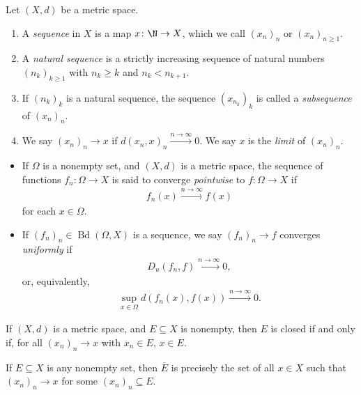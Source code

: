 \begin{definition}
  Let $\left(X,d\right)$ be a metric space.
  \begin{enumerate}[(1)]
    \item A \textit{sequence} in $X$ is a map $x\colon \N\rightarrow X$, which we call $\left(x_{n}\right)_{n}$ or $\left(x_{n}\right)_{n\geq 1}$.
    \item A \textit{natural sequence} is a strictly increasing sequence of natural numbers $\left(n_{k}\right)_{k\geq 1}$ with $n_{k}\geq k$ and $n_{k} < n_{k+1}$.
    \item If $\left(n_k\right)_{k}$ is a natural sequence, the sequence $\left(x_{n_k}\right)_{k}$ is called a \textit{subsequence} of $\left(x_{n}\right)_n$.
    \item We say $\left(x_n\right)_n\rightarrow x$ if $d\left(x_n,x\right)_{n} \xrightarrow{n\rightarrow\infty} 0$. We say $x$ is the \textit{limit} of $\left(x_n\right)_n$.
  \end{enumerate}
\end{definition}
\begin{example}\hfill
  \begin{itemize}
    \item If $\Omega$ is a nonempty set, and $\left(X,d\right)$ is a metric space, the sequence of functions $f_n\colon \Omega\rightarrow X$ is said to converge \textit{pointwise} to $f\colon \Omega\rightarrow X$ if
      \begin{align*}
        f_n\left(x\right)\xrightarrow{n\rightarrow\infty}f(x)
      \end{align*}
      for each $x\in \Omega$.
    \item If $\left(f_n\right)_n\in \operatorname{Bd}\left(\Omega,X\right)$ is a sequence, we say $\left(f_n\right)_n\rightarrow f$ converges \textit{uniformly} if
      \begin{align*}
        D_u\left(f_n,f\right)\xrightarrow{n\rightarrow\infty}0,
      \end{align*}
      or, equivalently,
      \begin{align*}
        \sup_{x\in\Omega}d\left(f_n(x),f(x)\right)\xrightarrow{n\rightarrow\infty}0.
      \end{align*}
  \end{itemize}
\end{example}
\begin{definition}
  If $\left(X,d\right)$ is a metric space, and $E\subseteq X$ is nonempty, then $E$ is closed if and only if, for all $\left(x_n\right)_n\rightarrow x$ with $x_n\in E$, $x\in E$.\newline

  If $E\subseteq X$ is any nonempty set, then $\overline{E}$ is precisely the set of all $x\in X$ such that $\left(x_n\right)_n\rightarrow x$ for some $\left(x_n\right)_n\subseteq E$.
\end{definition}
